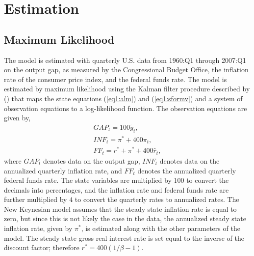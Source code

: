 \documentclass[11pt]{article}
\newcommand{\bdm}{\begin{displaymath}}
\newcommand{\edm}{\end{displaymath}}
\newcommand{\citee}[1]{\citeauthor*{#1} (\citeyear{#1})}
\newcommand{\h}[1]{\hat{#1}}
\newcommand{\ds}{\displaystyle}
\begin{document}
\section{Estimation}
\subsection{Maximum Likelihood}
The model is estimated with quarterly U.S. data from 1960:Q1 through 2007:Q1 on the output gap, as measured by the Congressional Budget Office, the inflation rate of the consumer price index, and the federal funds rate.  The model is estimated by maximum likelihood using the Kalman filter procedure described by \citee{hamilton} that maps the state equations (\ref{eq1:alm}) and (\ref{eq1:sformv}) and a system of observation equations to a log-likelihood function.  The observation equations are given by,
\bdm \begin{array}{c} \label{eq1:obs}  
\ds GAP_t = 100 \tilde{y}_t, \\
\ds INF_t = \pi^{*} + 400\pi_t, \\
\ds FF_t = r^{*} + \pi^* + 400\h{r}_t,
\end{array}
\edm
where $GAP_t$ denotes data on the output gap, $INF_t$ denotes data on the annualized quarterly inflation rate, and $FF_t$ denotes the annualized quarterly federal funds rate.  The state variables are multiplied by $100$ to convert the decimals into percentages, and the inflation rate and federal funds rate are further multiplied by $4$ to convert the quarterly rates to annualized rates.  The New Keynesian model assumes that the steady state inflation rate is equal to zero, but since this is not likely the case in the data, the annualized steady state inflation rate, given by  $\pi^*$, is estimated along with the other parameters of the model.  The steady state gross real interest rate is set equal to the inverse of the discount factor; therefore $r^* = 400(1/\beta-1)$.
\end{document}
